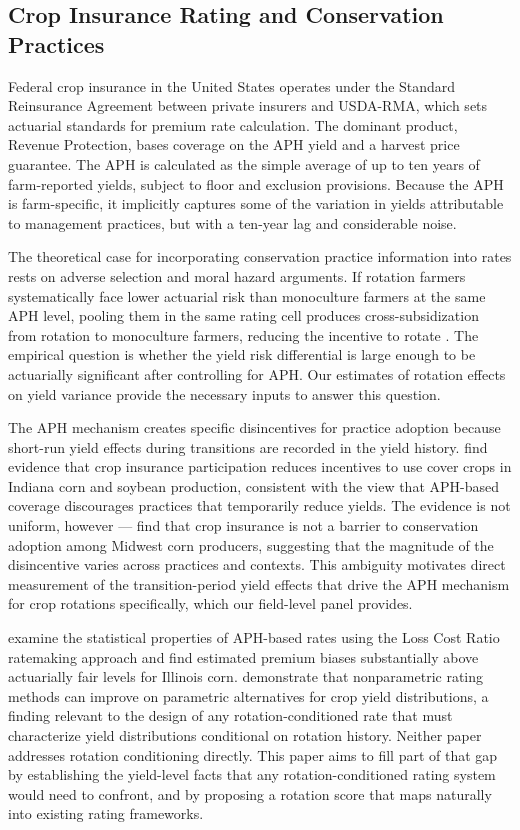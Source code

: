 \documentclass[12pt,letterpaper]{article}
\theoremstyle{remark}
\theoremstyle{plain}
\theoremstyle{definition}
\begin{document}
\subsection{\label{subsec:insurance_rating} Crop Insurance Rating and Conservation Practices}

Federal crop insurance in the United States operates under the Standard Reinsurance Agreement between private insurers and USDA-RMA, which sets actuarial standards for premium rate calculation. The dominant product, Revenue Protection, bases coverage on the APH yield and a harvest price guarantee. The APH is calculated as the simple average of up to ten years of farm-reported yields, subject to floor and exclusion provisions. Because the APH is farm-specific, it implicitly captures some of the variation in yields attributable to management practices, but with a ten-year lag and considerable noise.

The theoretical case for incorporating conservation practice information into rates rests on adverse selection and moral hazard arguments. If rotation farmers systematically face lower actuarial risk than monoculture farmers at the same APH level, pooling them in the same rating cell produces cross-subsidization from rotation to monoculture farmers, reducing the incentive to rotate \citep{Ramaswami1993, Babcock1996}. The empirical question is whether the yield risk differential is large enough to be actuarially significant after controlling for APH. Our estimates of rotation effects on yield variance provide the necessary inputs to answer this question.

The APH mechanism creates specific disincentives for practice adoption because short-run yield effects during transitions are recorded in the yield history. \cite{Connor2022} find evidence that crop insurance participation reduces incentives to use cover crops in Indiana corn and soybean production, consistent with the view that APH-based coverage discourages practices that temporarily reduce yields. The evidence is not uniform, however — \cite{Fleckenstein2020} find that crop insurance is not a barrier to conservation adoption among Midwest corn producers, suggesting that the magnitude of the disincentive varies across practices and contexts. This ambiguity motivates direct measurement of the transition-period yield effects that drive the APH mechanism for crop rotations specifically, which our field-level panel provides.

\cite{Woodard2011} examine the statistical properties of APH-based rates using the Loss Cost Ratio ratemaking approach and find estimated premium biases substantially above actuarially fair levels for Illinois corn. \cite{Ker2000} demonstrate that nonparametric rating methods can improve on parametric alternatives for crop yield distributions, a finding relevant to the design of any rotation-conditioned rate that must characterize yield distributions conditional on rotation history. Neither paper addresses rotation conditioning directly. This paper aims to fill part of that gap by establishing the yield-level facts that any rotation-conditioned rating system would need to confront, and by proposing a rotation score that maps naturally into existing rating frameworks.
\end{document}
